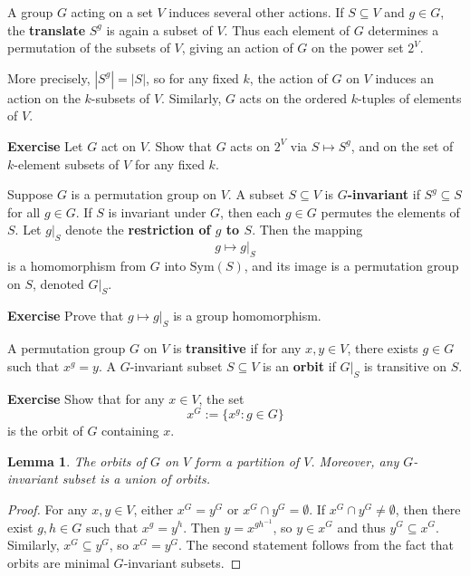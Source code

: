 \documentclass[12pt,a4paper,openany]{book}
\newtheorem{lemma}{Lemma}[section]
\begin{document}
A group $G$ acting on a set $V$ induces several other actions. If $S \subseteq V$ and $g \in G$, the \textbf{translate} $S^g$ is again a subset of $V$. Thus each element of $G$ determines a permutation of the subsets of $V$, giving an action of $G$ on the power set $2^V$.  

More precisely, $|S^g| = |S|$, so for any fixed $k$, the action of $G$ on $V$ induces an action on the $k$-subsets of $V$. Similarly, $G$ acts on the ordered $k$-tuples of elements of $V$.

\bigskip\noindent\textbf{Exercise}
Let $G$ act on $V$. Show that $G$ acts on $2^V$ via $S \mapsto S^g$, and on the set of $k$-element subsets of $V$ for any fixed $k$.




Suppose $G$ is a permutation group on $V$. A subset $S \subseteq V$ is \textbf{$G$-invariant} if $S^g \subseteq S$ for all $g \in G$. If $S$ is invariant under $G$, then each $g \in G$ permutes the elements of $S$. Let $g|_S$ denote the \textbf{restriction of $g$ to $S$}. Then the mapping
\[
g \mapsto g|_S
\]
is a homomorphism from $G$ into $\mathrm{Sym}(S)$, and its image is a permutation group on $S$, denoted $G|_S$.

\bigskip\noindent\textbf{Exercise}
Prove that $g \mapsto g|_S$ is a group homomorphism.


A permutation group $G$ on $V$ is \textbf{transitive} if for any $x, y \in V$, there exists $g \in G$ such that $x^g = y$. A $G$-invariant subset $S \subseteq V$ is an \textbf{orbit} if $G|_S$ is transitive on $S$.  

\bigskip\noindent\textbf{Exercise} Show that for any $x \in V$, the set
\[
x^G := \{ x^g : g \in G \}
\]
is the orbit of $G$ containing $x$.


\begin{lemma}\label{lem:orbit-partition}
The orbits of $G$ on $V$ form a partition of $V$. Moreover, any $G$-invariant subset is a union of orbits.
\end{lemma}

\begin{proof}
For any $x, y \in V$, either $x^G = y^G$ or $x^G \cap y^G = \emptyset$. If $x^G \cap y^G \neq \emptyset$, then there exist $g, h \in G$ such that $x^g = y^h$. Then $y = x^{gh^{-1}}$, so $y \in x^G$ and thus $y^G \subseteq x^G$. Similarly, $x^G \subseteq y^G$, so $x^G = y^G$. The second statement follows from the fact that orbits are minimal $G$-invariant subsets.
\end{proof}
\end{document}
